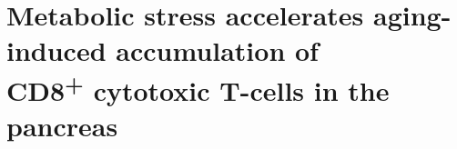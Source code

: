 

\clearpage

\section{Metabolic stress accelerates aging-induced accumulation of \\CD8\textsuperscript{+} cytotoxic T-cells in the pancreas}
\label{sec:sc_tcells}

